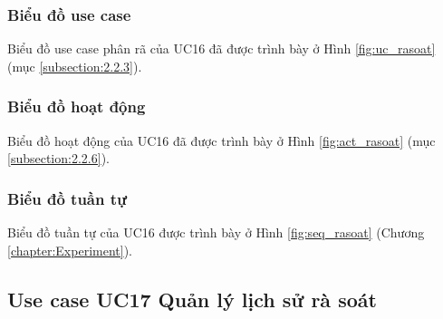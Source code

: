 \documentclass[../DoAn.tex]{subfiles}
\begin{document}
\subsubsection{Biểu đồ use case}
Biểu đồ use case phân rã của UC16 đã được trình bày ở Hình \ref{fig:uc_rasoat} (mục \ref{subsection:2.2.3}).

\subsubsection{Biểu đồ hoạt động}
Biểu đồ hoạt động của UC16 đã được trình bày ở Hình \ref{fig:act_rasoat} (mục \ref{subsection:2.2.6}).

\subsubsection{Biểu đồ tuần tự}
Biểu đồ tuần tự của UC16 được trình bày ở Hình \ref{fig:seq_rasoat} (Chương \ref{chapter:Experiment}).


\subsection{Use case UC17 Quản lý lịch sử rà soát}
\label{subsection:uc17}
\end{document}
